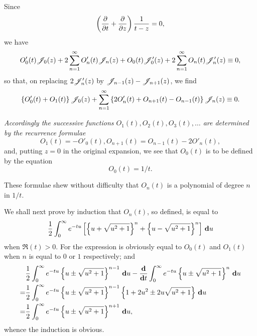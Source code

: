 Since
$$
\left( 
  \frac{\partial}{\partial t}
  +
  \frac{\partial}{\partial z}  
 \right)
\frac{1}{t-z}
=
0,
$$
we have
$$
O'_{0}(t) \mathscr{J}_{0}(z)
+
2 \sum_{n=1}^{\infty}
O'_{n}(t) \mathscr{J}_{n}(z)
+
O_{0}(t) \mathscr{J}'_{0}(z)
+
2 \sum_{n=1}^{\infty}
O_{n}(t) \mathscr{J}'_{n}(z)
\equiv
0,
$$
so that, on replacing $2\mathscr{J}'_{n}(z)$ by
$\mathscr{J}_{n-1}(z) - \mathscr{J}_{n+1}(z)$, we find
$$
\left\{  O'_{0}(t) + O_{1}(t)  \right\} \mathscr{J}_{0}(z)
+
\sum_{n=1}^{\infty}
\left\{  2 O'_{n}(t) + O_{n+1}(t) - O_{n-1}(t)   \right\}
\mathscr{J}_{n}(z)
\equiv
0.
$$

%
%
\emph{Accordingly the successive functions $O_{1}(t), O_{2}(t), O_{3}(t),
  \ldots$ are determined by the recurrence formulae}
$$
O_{1}(t) = -O'_{0}(t),
O_{n+1}(t) = O_{n-1}(t) - 2O'_{n}(t),
$$
and, putting $z=0$ in the original expansion, we see that $O_{0}(t)$ is
to be defined by the equation
$$
O_{0}(t) = 1/t.
$$

These formulae shew without difficulty that $O_{n}(t)$ is a polynomial
of degree $n$ in $1/t$.

We shall next prove by induction that $O_{n}(t)$, so defined, is equal
to
$$
\frac{1}{2}
\int_{0}^{\infty}
e^{-tu}
\left[ 
  \left\{ u + \sqrt{u^{2}+1} \right\}^{n}
  +
  \left\{ u - \sqrt{u^{2}+1} \right\}^{n}
 \right]
\, \mathbf{d} u
$$
when $\Re(t) > 0$.
For the expression is obviously equal to $O_{0}(t)$ and $O_{1}(t)$ when
$n$ is equal to $0$ or $1$ respectively; and
\begin{align*}
  &
  \frac{1}{2}
  \int_{0}^{\infty}
  e^{-tu}
  \left\{ u \pm \sqrt{u^{2}+1} \right\}^{n-1}
  \, \mathbf{d} u
  -
  \frac{\mathbf{d}}{\mathbf{d} t}
  \int_{0}^{\infty}
  e^{-tu}
  \left\{ u \pm \sqrt{u^{2}+1} \right\}^{n}
  \, \mathbf{d} u
  \\
  =
  &  
  \frac{1}{2}
  \int_{0}^{\infty}
  e^{-tu}
  \left\{ u \pm \sqrt{u^{2}+1} \right\}^{n-1}
  \left\{ 1 + 2u^{2} \pm 2u \sqrt{u^{2}+1} \right\}
  \, \mathbf{d} u
  \\
  =
  &
  \frac{1}{2}
  \int_{0}^{\infty}
  e^{-tu}
  \left\{ u \pm \sqrt{u^{2}+1} \right\}^{n+1}
  \, \mathbf{d} u,
\end{align*}
whence the induction is obvious.

